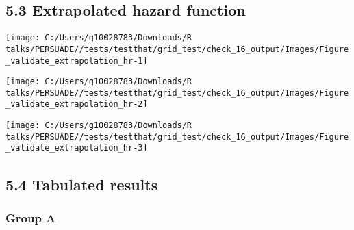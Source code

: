 \documentclass[
]{article}
\begin{document}
\subsection{5.3 Extrapolated hazard
function}\label{extrapolated-hazard-function}

\begin{flushleft}\texttt{[image: C:/Users/g10028783/Downloads/R talks/PERSUADE//tests/testthat/grid\_test/check\_16\_output/Images/Figure\_validate\_extrapolation\_hr-1]} \end{flushleft}

\begin{flushleft}\texttt{[image: C:/Users/g10028783/Downloads/R talks/PERSUADE//tests/testthat/grid\_test/check\_16\_output/Images/Figure\_validate\_extrapolation\_hr-2]} \end{flushleft}

\begin{flushleft}\texttt{[image: C:/Users/g10028783/Downloads/R talks/PERSUADE//tests/testthat/grid\_test/check\_16\_output/Images/Figure\_validate\_extrapolation\_hr-3]} \end{flushleft}

\clearpage

\subsection{5.4 Tabulated results}\label{tabulated-results}

\subsubsection{Group A}\label{group-a}
\end{document}
